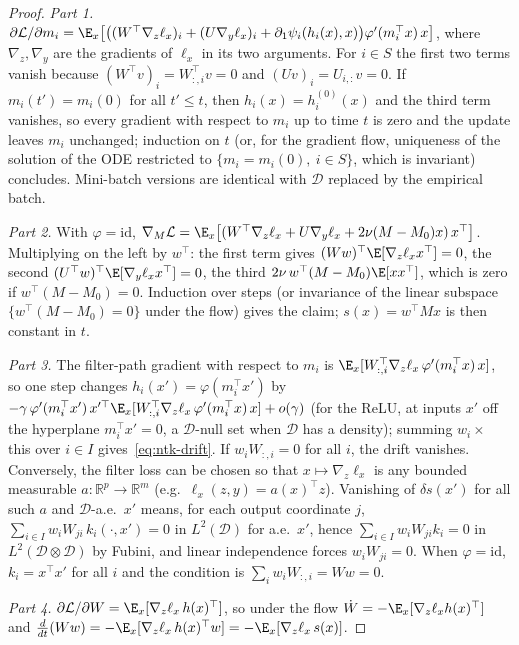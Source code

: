 \begin{proof}
\emph{Part 1.} $\partial \mathcal{L}/\partial m_i = \E_x\big[\big((W^\top \nabla_z \ell_x)_i + (U \nabla_y \ell_x)_i + \partial_1\psi_i(h_i(x), x)\big)\varphi'(m_i^\top x)\, x\big]$, where $\nabla_z, \nabla_y$ are the gradients of $\ell_x$ in its two arguments. For $i \in S$ the first two terms vanish because $(W^\top v)_i = W_{:,i}^\top v = 0$ and $(U v)_i = U_{i,:} v = 0$. If $m_i(t') = m_i(0)$ for all $t' \le t$, then $h_i(x) = h_i^{(0)}(x)$ and the third term vanishes, so every gradient with respect to $m_i$ up to time $t$ is zero and the update leaves $m_i$ unchanged; induction on $t$ (or, for the gradient flow, uniqueness of the solution of the ODE restricted to $\{m_i = m_i(0),\ i \in S\}$, which is invariant) concludes. Mini-batch versions are identical with $\mathcal{D}$ replaced by the empirical batch.

\emph{Part 2.} With $\varphi = \mathrm{id}$, $\nabla_M \mathcal{L} = \E_x\big[(W^\top \nabla_z\ell_x + U \nabla_y \ell_x + 2\nu (M - M_0) x)\, x^\top\big]$. Multiplying on the left by $w^\top$: the first term gives $(Ww)^\top \E[\nabla_z \ell_x x^\top] = 0$, the second $(U^\top w)^\top \E[\nabla_y\ell_x x^\top] = 0$, the third $2\nu\, w^\top (M - M_0)\E[x x^\top]$, which is zero if $w^\top(M - M_0) = 0$. Induction over steps (or invariance of the linear subspace $\{w^\top (M - M_0) = 0\}$ under the flow) gives the claim; $s(x) = w^\top M x$ is then constant in $t$.

\emph{Part 3.} The filter-path gradient with respect to $m_i$ is $\E_x[W_{:,i}^\top \nabla_z \ell_x\, \varphi'(m_i^\top x)\, x]$, so one step changes $h_i(x') = \varphi(m_i^\top x')$ by $-\gamma\, \varphi'(m_i^\top x')\, x'^\top \E_x[W_{:,i}^\top\nabla_z\ell_x\,\varphi'(m_i^\top x)\, x] + o(\gamma)$ (for the ReLU, at inputs $x'$ off the hyperplane $m_i^\top x' = 0$, a $\mathcal{D}$-null set when $\mathcal{D}$ has a density); summing $w_i \times$ this over $i \in I$ gives~\eqref{eq:ntk-drift}. If $w_i W_{:,i} = 0$ for all $i$, the drift vanishes. Conversely, the filter loss can be chosen so that $x \mapsto \nabla_z \ell_x$ is any bounded measurable $a : \mathbb{R}^p \to \mathbb{R}^m$ (e.g.\ $\ell_x(z, y) = a(x)^\top z$). Vanishing of $\delta s(x')$ for all such $a$ and $\mathcal{D}$-a.e.\ $x'$ means, for each output coordinate $j$, $\sum_{i \in I} w_i W_{ji}\, k_i(\cdot, x') = 0$ in $L^2(\mathcal{D})$ for a.e.\ $x'$, hence $\sum_{i \in I} w_i W_{ji} k_i = 0$ in $L^2(\mathcal{D} \otimes \mathcal{D})$ by Fubini, and linear independence forces $w_i W_{ji} = 0$. When $\varphi = \mathrm{id}$, $k_i = x^\top x'$ for all $i$ and the condition is $\sum_i w_i W_{:,i} = Ww = 0$.

\emph{Part 4.} $\partial \mathcal{L}/\partial W = \E_x[\nabla_z \ell_x\, h(x)^\top]$, so under the flow $\dot W = -\E_x[\nabla_z\ell_x h(x)^\top]$ and $\tfrac{d}{dt}(W w) = -\E_x[\nabla_z \ell_x\, h(x)^\top w] = -\E_x[\nabla_z \ell_x\, s(x)]$.
\end{proof}

